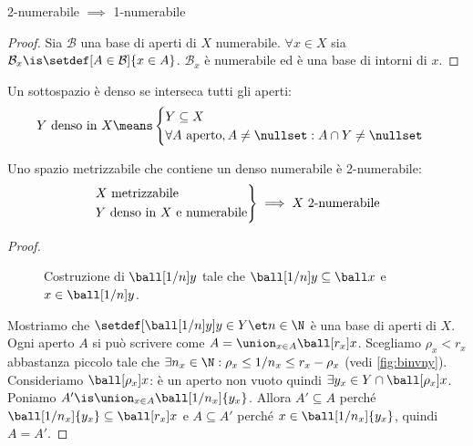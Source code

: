 
\begin{lemma}
	2-numerabile $\implies$ 1-numerabile
\end{lemma}

\begin{proof}
	Sia $\mathcal B$ una base di aperti di $X$ numerabile.
	$\forall x\in X$ sia $\mathcal B_x\is\setdef[A\in\mathcal B]{x\in A}$.
	$\mathcal B_x$ è numerabile ed è una base di intorni di $x$.
\end{proof}

\begin{defn}[Densità]
	Un sottospazio è denso se interseca tutti gli aperti:
	\[\text{$Y$ denso in $X$}\means
	\begin{cases}
		Y\subseteq X\\
		\forall A\text{ aperto},A\neq\nullset:A\cap Y\neq\nullset
	\end{cases}\]
\end{defn}

\begin{lemma}
	\label{th:metrdens2num}
	Uno spazio metrizzabile che contiene un denso numerabile è 2-numerabile:
	\[\begin{rcases}
		X\text{ metrizzabile}\\
		\text{$Y$ denso in $X$ e numerabile}
	\end{rcases}\implies
	X\text{ 2-numerabile}\]
\end{lemma}

\begin{proof}
	\begin{figure}
		\centering
		\caption{Costruzione di $\ball[1/n]y$ tale che $\ball[1/n]y\subseteq\ball x$ e $x\in\ball[1/n]y$.}
		\label{fig:binvny}
	\end{figure}
	Mostriamo che $\setdef[{\ball[1/n]y}]{y\in Y\et n\in\N}$ è una base di aperti di $X$.
	Ogni aperto $A$ si può scrivere come $A=\union_{x\in A}\ball[r_x]x$.
	Scegliamo $\rho_x<r_x$ abbastanza piccolo tale che $\exists n_x\in\N:\rho_x\leq 1/n_x\leq r_x-\rho_x$ (vedi \autoref{fig:binvny}).
	Consideriamo $\ball[\rho_x]x$: è un aperto non vuoto quindi $\exists y_x\in Y\cap\ball[\rho_x]x$.
	Poniamo $A'\is\union_{x\in A}\ball[1/n_x]{y_x}$.
	Allora $A'\subseteq A$ perché $\ball[1/n_x]{y_x}\subseteq\ball[r_x]x$
	e $A\subseteq A'$ perché $x\in\ball[1/n_x]{y_x}$,
	quindi $A=A'$.
\end{proof}

